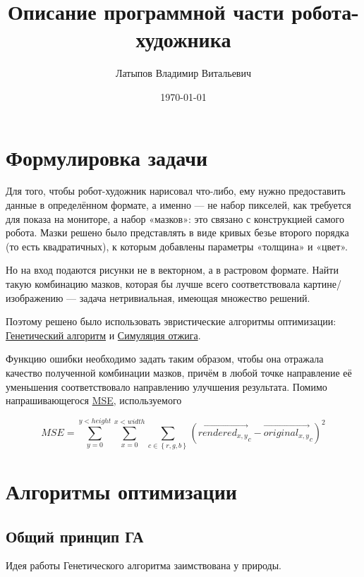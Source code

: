 \documentclass[11pt]{article}
\title{Описание программной части робота-художника}
\author{Латыпов Владимир Витальевич}
\date{\today}
\begin{document}
    \maketitle
    \newpage


    \section{Формулировка задачи}

    Для того, чтобы робот-художник нарисовал что-либо, ему нужно предоставить данные в определённом формате, а именно — не набор пикселей,
    как требуется для показа на мониторе, а набор «мазков»: это связано с конструкцией самого робота.
    Мазки решено было представлять в виде кривых безье второго порядка (то есть квадратичных), к которым добавлены параметры «толщина» и «цвет».

    Но на вход подаются рисунки не в векторном, а в растровом формате.
    Найти такую комбинацию мазков, которая бы лучше всего соответствовала картине/изображению — задача нетривиальная, имеющая множество решений.

    Поэтому решено было использовать эвристические алгоритмы оптимизации:
    \href{https://en.wikipedia.org/wiki/Simulated_annealing}{Генетический алгоритм} и \href{https://en.wikipedia.org/wiki/Simulated_annealing}{Симуляция отжига}.

    Функцию ошибки необходимо задать таким образом, чтобы она отражала качество полученной комбинации мазков,
    причём в любой точке направление её уменьшения соответствовало направлению улучшения результата.
    Помимо напрашивающегося \href{https://en.wikipedia.org/wiki/Mean_squared_error}{MSE}, используемого

    \begin{equation}\label{eq:equation}
        MSE = \sum_{y = 0}^{y < height} { \sum_{x = 0}^{x < width} { \sum_{c \in  \left\{ r, g, b \right\} } { \left( {\overrightarrow {rendered_{x, y}}}_c - {\overrightarrow{original_{x, y}}}_c\right)^2 }}}
    \end{equation}


    \section {Алгоритмы оптимизации}

    \subsection{Общий принцип ГА}
    Идея работы Генетического алгоритма заимствована у природы.
\end{document}
